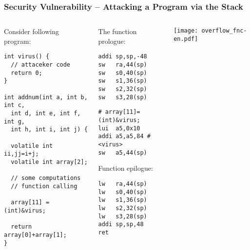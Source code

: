 \documentclass{beamer}
\begin{document}
\begin{frame}[fragile,shrink=5]
\frametitle{Security Vulnerability  -- Attacking a Program via the Stack}

\begin{columns}
\begin{column}{0.42\textwidth}
Consider following program:

\begin{verbatim}
int virus() {
  // attaceker code
  return 0;
}

int addnum(int a, int b, int c,
  int d, int e, int f, int g,
  int h, int i, int j) {
  
  volatile int ii,jj=i+j;
  volatile int array[2];
  
  // some computations
  // function calling
  
  array[11] = (int)&virus;
  
  return array[0]+array[1];
}
\end{verbatim}
\end{column}   
\begin{column}{0.25\textwidth}
The function prologue:

\begin{verbatim}
addi sp,sp,-48
sw   ra,44(sp)
sw   s0,40(sp)
sw   s1,36(sp)
sw   s2,32(sp)
sw   s3,28(sp)
\end{verbatim}


\begin{verbatim}
# array[11]=(int)&virus;
lui  a5,0x10
addi a5,a5,84 # <virus>
sw   a5,44(sp)
\end{verbatim}

Function epilogue:

\begin{verbatim}
lw   ra,44(sp)
lw   s0,40(sp)
lw   s1,36(sp)
lw   s2,32(sp)
lw   s3,28(sp)
addi sp,sp,48
ret
\end{verbatim}
\end{column}
\begin{column}{0.33\textwidth}  
\texttt{[image: overflow\_fnc-en.pdf]}
\end{column}
\end{columns}
\end{frame}
\end{document}
